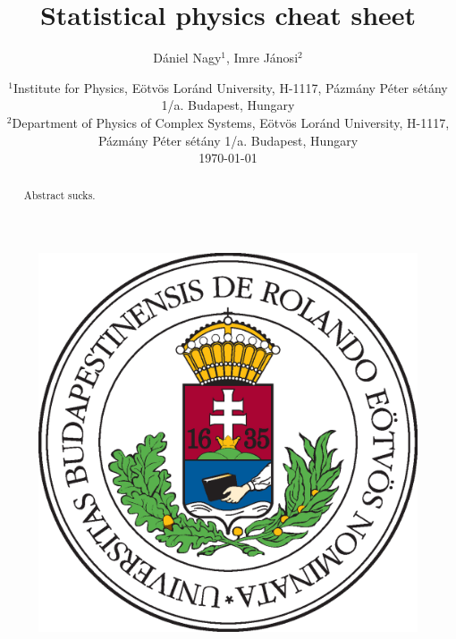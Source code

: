 \documentclass[11pt, a4paper]{article}
\title{Statistical physics cheat sheet}
\author{Dániel Nagy$^1$, Imre Jánosi$^2$}
\date{%
    $^1$Institute for Physics, Eötvös Loránd University, H-1117, Pázmány Péter sétány 1/a. Budapest, Hungary\\%
    $^2$Department of Physics of Complex Systems, Eötvös Loránd University, H-1117, Pázmány Péter sétány 1/a. Budapest, Hungary\\[2ex]%
    \today
}
\begin{document}
\maketitle
\vspace{0.5cm}
\begin{figure}[h!]
    \centering
    \includegraphics[scale=0.3]{images/elte.eps}
\end{figure}
\vspace{0.5cm}

\begin{abstract}
    Abstract sucks.
\end{abstract}
\end{document}
